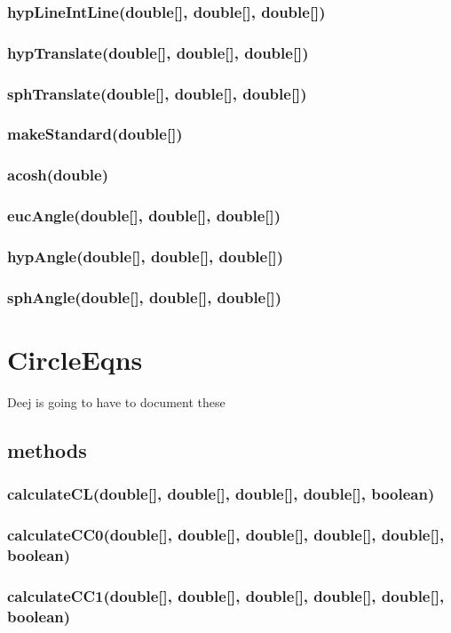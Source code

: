 \documentclass[a4paper,10pt]{report}
\begin{document}
\subsubsection{hypLineIntLine(double[], double[], double[])}
\subsubsection{hypTranslate(double[], double[], double[])}
\subsubsection{sphTranslate(double[], double[], double[])}
\subsubsection{makeStandard(double[])}
\subsubsection{acosh(double)}
\subsubsection{eucAngle(double[], double[], double[])}
\subsubsection{hypAngle(double[], double[], double[])}
\subsubsection{sphAngle(double[], double[], double[])}
  \section{CircleEqns}Deej is going to have to document these
  \subsection{methods}
\subsubsection{calculateCL(double[], double[], double[], double[], boolean)}
\subsubsection{calculateCC0(double[], double[], double[], double[], double[], boolean)}
\subsubsection{calculateCC1(double[], double[], double[], double[], double[], boolean)}
\end{document}
